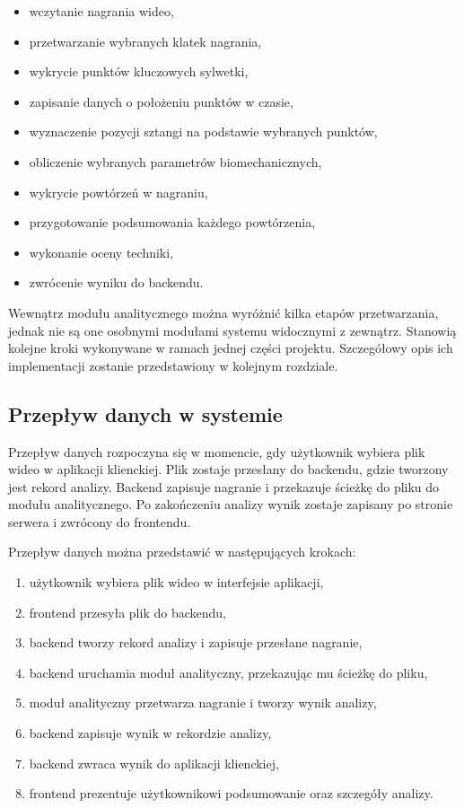 \begin{itemize}
\item wczytanie nagrania wideo,
\item przetwarzanie wybranych klatek nagrania,
\item wykrycie punktów kluczowych sylwetki,
\item zapisanie danych o położeniu punktów w czasie,
\item wyznaczenie pozycji sztangi na podstawie wybranych punktów,
\item obliczenie wybranych parametrów biomechanicznych,
\item wykrycie powtórzeń w nagraniu,
\item przygotowanie podsumowania każdego powtórzenia,
\item wykonanie oceny techniki,
\item zwrócenie wyniku do backendu.
\end{itemize}

Wewnątrz modułu analitycznego można wyróżnić kilka etapów przetwarzania, jednak nie są one osobnymi modułami systemu widocznymi z zewnątrz. Stanowią kolejne kroki wykonywane w ramach jednej części projektu. Szczegółowy opis ich implementacji zostanie przedstawiony w kolejnym rozdziale.

\subsection{Przepływ danych w systemie}

Przepływ danych rozpoczyna się w momencie, gdy użytkownik wybiera plik wideo w aplikacji klienckiej. Plik zostaje przesłany do backendu, gdzie tworzony jest rekord analizy. Backend zapisuje nagranie i przekazuje ścieżkę do pliku do modułu analitycznego. Po zakończeniu analizy wynik zostaje zapisany po stronie serwera i zwrócony do frontendu.

Przepływ danych można przedstawić w następujących krokach:

\begin{enumerate}
\item użytkownik wybiera plik wideo w interfejsie aplikacji,
\item frontend przesyła plik do backendu,
\item backend tworzy rekord analizy i zapisuje przesłane nagranie,
\item backend uruchamia moduł analityczny, przekazując mu ścieżkę do pliku,
\item moduł analityczny przetwarza nagranie i tworzy wynik analizy,
\item backend zapisuje wynik w rekordzie analizy,
\item backend zwraca wynik do aplikacji klienckiej,
\item frontend prezentuje użytkownikowi podsumowanie oraz szczegóły analizy.
\end{enumerate}

